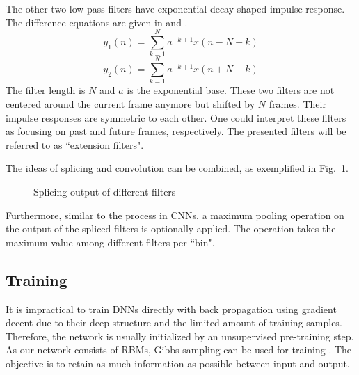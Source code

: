 \documentclass{article}
\begin{document}
The other two low pass filters have exponential decay shaped impulse response. The difference equations are given in  and . 
\begin{equation}\label{filter1}
y_{1}(n) = \sum_{k=1}^N a^{-k+1} x(n-N+k)
\end{equation}
\begin{equation}\label{filter2}
y_{2}(n) = \sum_{k=1}^N a^{-k+1} x(n+N-k)
\end{equation} 
The filter length is $N$ and $a$ is the exponential base. 
These two filters are not centered around the current frame anymore but shifted by $N$ frames. Their impulse responses are symmetric to each other. One could interpret these filters as focusing on past and future frames, respectively. The presented filters will be referred to as ``extension filters". 

The ideas of splicing and convolution can be combined, as exemplified in Fig.~\ref{fig:filtersplice}.
\begin{figure}
 \centerline{}
 \caption{Splicing output of different filters}
 \label{fig:filtersplice}
\end{figure}

Furthermore, similar to the process in CNNs, a maximum pooling operation on the output of the spliced filters is optionally applied. The operation takes the maximum value among different filters per ``bin". 
 
\subsection{Training}\label{sec:train}
It is impractical to train DNNs directly with back propagation using gradient decent due to their deep structure and the limited amount of training samples. Therefore, the network is usually initialized by an unsupervised pre-training step. As our network consists of RBMs, Gibbs sampling can be used for training \cite{hinton2006fast}. The objective is to retain as much information as possible between input and output. 
\end{document}

